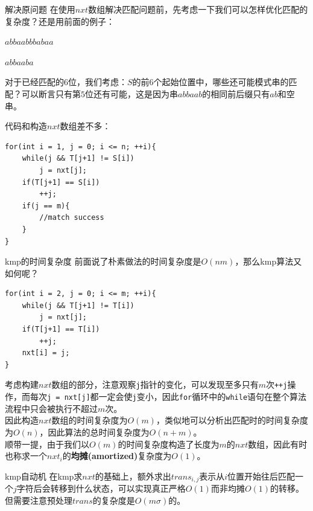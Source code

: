 \documentclass{beamer}
\begin{document}
\begin{frame}[fragile]{解决原问题}
	在使用$nxt$数组解决匹配问题前，先考虑一下我们可以怎样优化匹配的复杂度？还是用前面的例子：
	
	{\color{red} $abbaab$}$bbabaa$
	
	{\color{blue} $abbaab$}$a$
	
	\pause
	
	对于已经匹配的$6$位，我们考虑：$S$的前$6$个起始位置中，哪些还可能模式串的匹配？可以断言只有第$5$位还有可能，这是因为串$abbaab$的相同前后缀只有$ab$和空串。
	\pause
	
	代码和构造$nxt$数组差不多：
	
	\begin{verbatim}
for(int i = 1, j = 0; i <= n; ++i){
    while(j && T[j+1] != S[i])
        j = nxt[j];
    if(T[j+1] == S[i])
        ++j;
    if(j == m){
        //match success
    }
}
	\end{verbatim}
	
\end{frame}

\begin{frame}[fragile]{kmp的时间复杂度}
	前面说了朴素做法的时间复杂度是$O(nm)$，那么kmp算法又如何呢？
	\pause
	
	\begin{verbatim}
for(int i = 2, j = 0; i <= m; ++i){
    while(j && T[j+1] != T[i])
        j = nxt[j];
    if(T[j+1] == T[i])
        ++j;
    nxt[i] = j;
}
	\end{verbatim}
	
	考虑构建$nxt$数组的部分，注意观察\texttt{j}指针的变化，可以发现至多只有$m$次\texttt{++j}操作，而每次\texttt{j = nxt[j]}都一定会使\texttt{j}变小，因此\texttt{for}循环中的\texttt{while}语句在整个算法流程中只会被执行不超过$m$次。
	\pause\\
	
	因此构造$nxt$数组的时间复杂度为$O(m)$，类似地可以分析出匹配时的时间复杂度为$O(n)$，因此算法的总时间复杂度为$O(n+m)$。
	\pause\\
	
	顺带一提，由于我们以$O(m)$的时间复杂度构造了长度为$m$的$nxt$数组，因此有时也称求一个$nxt_i$的\textbf{均摊(amortized)}复杂度为$O(1)$。
\end{frame}
\begin{frame}{kmp自动机}
	在kmp求$nxt$的基础上，额外求出$trans_{i,j}$表示从$i$位置开始往后匹配一个$j$字符后会转移到什么状态，可以实现真正严格$O(1)$而非均摊$O(1)$的转移。但需要注意预处理$trans$的复杂度是$O(m\sigma)$的。
\end{frame}
\end{document}
